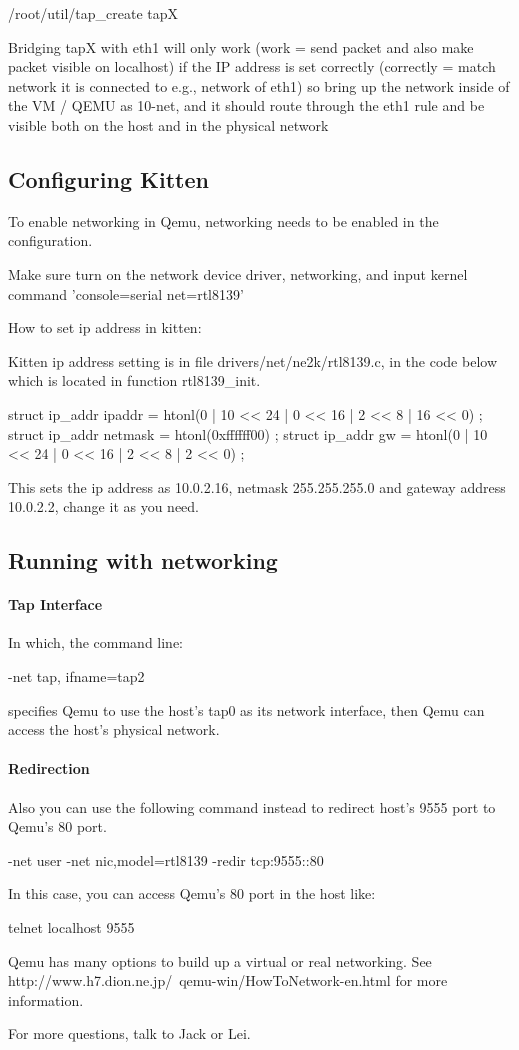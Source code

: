 \documentclass[11pt]{article}
\begin{document}
/root/util/tap\_create tapX

Bridging tapX with eth1 will only work (work = send packet and also make packet visible on localhost) if the IP address is set correctly (correctly = match network it is connected to  e.g., network of eth1)  so bring up the network inside of the VM / QEMU as 10-net, and it should route through the eth1 rule and be visible both on the host and in the physical network


\subsection{Configuring Kitten}

To enable networking in Qemu, networking needs to be enabled in the configuration.

Make sure turn on the network device driver, networking, and input
kernel command 'console=serial net=rtl8139'

How to set ip address in kitten:

Kitten ip address setting is in file drivers/net/ne2k/rtl8139.c, in the code below which is located in function rtl8139\_init.

  struct ip\_addr ipaddr = { htonl(0 | 10 << 24 | 0 << 16 | 2 << 8 | 16 << 0) }; 
  struct ip\_addr netmask = { htonl(0xffffff00) }; 
  struct ip\_addr gw = { htonl(0 | 10 << 24 | 0 << 16 | 2 << 8 | 2 << 0) };

This sets the ip address as 10.0.2.16, netmask 255.255.255.0 and gateway address 10.0.2.2, change it as you need.



\subsection{Running with networking}

\paragraph*{Tap Interface}
In which, the command line: 

-net tap, ifname=tap2

specifies Qemu to use the host's tap0 as its network interface, then Qemu can access the host's physical network.

\paragraph*{Redirection}

Also you can use the following command instead to redirect host's 9555 port to Qemu's 80 port.

-net user -net nic,model=rtl8139  -redir tcp:9555::80

In this case, you can access Qemu's 80 port in the host like:

telnet localhost 9555

Qemu has many options to build up a virtual or real networking. See http://www.h7.dion.ne.jp/~qemu-win/HowToNetwork-en.html for more information.






For more questions, talk to Jack or Lei.
\end{document}
